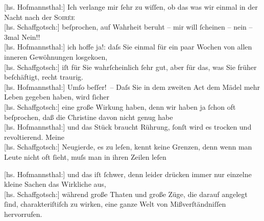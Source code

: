 \pstart
           {[}hs. Hofmannsthal:{]} Ich verlange mir{ }ſehr zu wiſſen, ob das was wir einmal
               in der Nacht nach der \textsc{Soirée}{\\}{[}hs. Schaffgotsch:{]} beſprochen, auf Wahrheit beruht – mir will{ }ſcheinen –
               nein – 3mal Nein!! {\\}{[}hs. Hofmannsthal:{]} ich hoffe ja!: daſs Sie einmal für ein paar Wochen von
               allen inneren Gewöhnungen losgeko{\geminationm}en, {\\}{[}hs. Schaffgotsch:{]} iſt für Sie wahrſcheinlich{ }ſehr gut, aber \introOben{}für\introOben{} das, was Sie früher beſchäftigt, recht traurig. {\\}{[}hs. Hofmannsthal:{]} Umſo beſſer! – Daſs Sie in dem zweiten Act dem Mädel mehr Leben gegeben haben, wird{ }ſicher {\\}{[}hs. Schaffgotsch:{]} eine große Wirkung haben, denn wir haben ja{ }ſchon oft
               beſprochen, daß die Christine
               davon nicht genug habe {\\}{[}hs. Hofmannsthal:{]} und das Stück braucht Rührung,{ }ſonſt wird es trocken und
               revoltierend. Meine {\\}{[}hs. Schaffgotsch:{]} Neugierde, es zu leſen, kennt keine Grenzen, denn wenn
               man Leute nicht oft{ }ſieht, muſs man in ihren Zeilen leſen\pend
           
\pstart
           {\pb}{[}hs. Hofmannsthal:{]} und das iſt{ }ſchwer, denn leider drücken immer nur
               einzelne kleine Sachen das Wirkliche aus, {\\}{[}hs. Schaffgotsch:{]} während große Thaten und große Züge, die darauf
               angelegt{ }ſind, charakteriſtiſch zu wirken, eine ganze Welt von Mißverſtändniſſen
               hervorrufen.\pend
           
